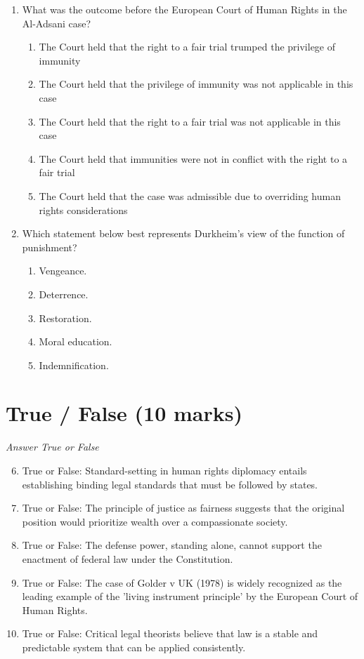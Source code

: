 \documentclass[12pt]{article}
\begin{document}
\begin{enumerate}[label=\arabic*.]
\begin{enumerate}[label=(\alph*)]
\end{enumerate}
\item What was the outcome before the European Court of Human Rights in the Al-Adsani case?
\begin{enumerate}[label=(\alph*)]
    \item The Court held that the right to a fair trial trumped the privilege of immunity
    \item The Court held that the privilege of immunity was not applicable in this case
    \item The Court held that the right to a fair trial was not applicable in this case
    \item The Court held that immunities were not in conflict with the right to a fair trial
    \item The Court held that the case was admissible due to overriding human rights considerations
\end{enumerate}
\item Which statement below best represents Durkheim's view of the function of punishment?
\begin{enumerate}[label=(\alph*)]
    \item Vengeance.
    \item Deterrence.
    \item Restoration.
    \item Moral education.
    \item Indemnification.
\end{enumerate}
\end{enumerate}

\section*{True / False (10 marks)}
\textit{Answer True or False}
\begin{enumerate}[label=\arabic*.]
\setcounter{enumi}{5}
\item True or False: Standard-setting in human rights diplomacy entails establishing binding legal standards that must be followed by states.
\item True or False: The principle of justice as fairness suggests that the original position would prioritize wealth over a compassionate society.
\item True or False: The defense power, standing alone, cannot support the enactment of federal law under the Constitution.
\item True or False: The case of Golder v UK (1978) is widely recognized as the leading example of the 'living instrument principle' by the European Court of Human Rights.
\item True or False: Critical legal theorists believe that law is a stable and predictable system that can be applied consistently.
\end{enumerate}
\end{document}

